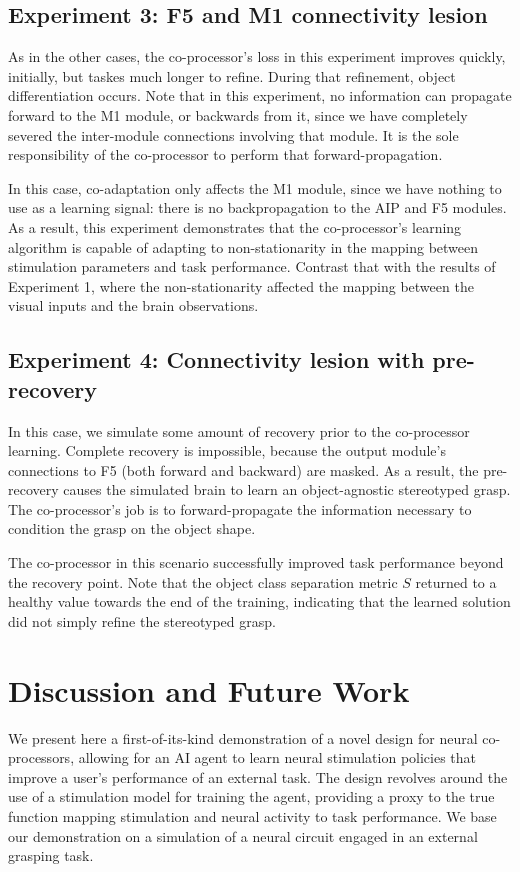 \documentclass[12pt]{iopart}
\begin{document}
\subsection{Experiment 3: F5 and M1 connectivity lesion}
As in the other cases, the co-processor's loss in this experiment improves
quickly, initially, but taskes much longer to refine. During that refinement,
object differentiation occurs. Note that in this experiment, no information
can propagate forward to the M1 module, or backwards from it, since we have
completely severed the inter-module connections involving that module. It is
the sole responsibility of the co-processor to perform that
forward-propagation.

In this case, co-adaptation only affects the M1 module, since we have nothing
to use as a learning signal: there is no backpropagation to the AIP and
F5 modules. As a result, this experiment demonstrates that the
co-processor's learning algorithm is capable of adapting to non-stationarity
in the mapping between stimulation parameters and task performance. Contrast
that with the results of Experiment 1, where the non-stationarity affected
the mapping between the visual inputs and the brain observations.

\subsection{Experiment 4: Connectivity lesion with pre-recovery}
In this case, we simulate some amount of recovery prior to the co-processor
learning. Complete recovery is impossible, because the output module's
connections to F5 (both forward and backward) are masked. As a result,
the pre-recovery causes the simulated brain to learn an object-agnostic
stereotyped grasp. The co-processor's job is to forward-propagate the
information necessary to condition the grasp on the object shape.

The co-processor in this scenario successfully improved task performance
beyond the recovery point. Note that the object class separation metric
$S$ returned to a healthy value towards the end of the training,
indicating that the learned solution did not simply refine the
stereotyped grasp.

\section{Discussion and Future Work}
\label{sec:discussion}

We present here a first-of-its-kind demonstration of a novel design for neural co-processors,
allowing for an AI agent to learn neural stimulation policies that improve a user's performance
of an external task. The design revolves around the use of a stimulation model for training the
agent, providing a proxy to the true function mapping stimulation and neural activity
to task performance. We base our demonstration on a simulation of a neural circuit engaged in
an external grasping task.
\end{document}
